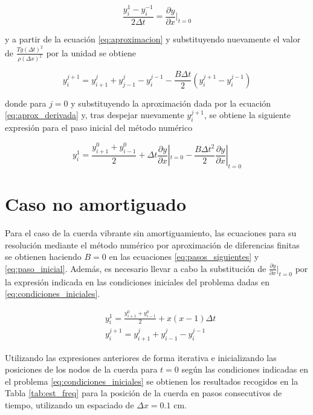 \documentclass[11pt]{article}
\begin{document}
\begin{equation}
\frac{y^1_i - y^{-1}_i}{2\Delta{t}} = \frac{\partial{y}}{\partial{x}}|_{t=0}
\label{eq:aprox_derivada}
\end{equation}

y a partir de la ecuación \eqref{eq:aproximacion} y substituyendo nuevamente el valor de 
$\frac{Tg(\Delta{t})^2}{\rho(\Delta{x})^2}$ por la unidad se obtiene

\begin{equation}
y^{j+1}_i = y^{j}_{i+1} + y^{j}_{j-1} - y^{j-1}_i - \frac{B\Delta{t}}{2}(y^{j+1}_i - y^{j-1}_i)
\end{equation}

donde para $j=0$ y substituyendo la aproximación dada por la ecuación
\ref{eq:aprox_derivada} y, tras despejar nuevamente $y^{j+1}_i$, se obtiene la siguiente
expresión para el paso inicial del método numérico

\begin{equation}
y^1_i = \frac{y^0_{i+1} + y^0_{i-1}}{2} + \Delta{t}\frac{\partial{y}}{\partial{x}}|_{t=0}
	- \frac{B\Delta{t}^2}{2}\frac{\partial{y}}{\partial{x}}|_{t=0}
\label{eq:paso_inicial}
\end{equation}

\section{Caso no amortiguado}
Para el caso de la cuerda vibrante sin amortiguamiento, las ecuaciones para su resolución
mediante el método numérico por aproximación de diferencias finitas se obtienen haciendo
$B=0$ en las ecuaciones \eqref{eq:pasos_siguientes} y \eqref{eq:paso_inicial}. Además, es
necesario llevar a cabo la substitución de $\frac{\partial{y}}{\partial{x}}|_{t=0}$ por la
expresión indicada en las condiciones iniciales del problema dadas en
\eqref{eq:condiciones_iniciales}.

\begin{subequations}
\begin{flalign}
	&y^1_i = \frac{y^0_{i+1} + y^0_{i-1}}{2} + x(x-1)\Delta{t}\\
	&y^{j+1}_i = y^j_{i+1} + y^j_{i-1} - y^{j-1}_i
\end{flalign}
\end{subequations}

Utilizando las expresiones anteriores de forma iterativa e inicializando las posiciones de
los nodos de la cuerda para $t=0$ según las condiciones indicadas en el problema
\eqref{eq:condiciones_iniciales} se obtienen los resultados recogidos en la Tabla 
\ref{tab:est_freq} para la posición de la cuerda en pasos consecutivos de tiempo, 
utilizando un espaciado de $\Delta{x} = 0.1$ cm.
\end{document}
